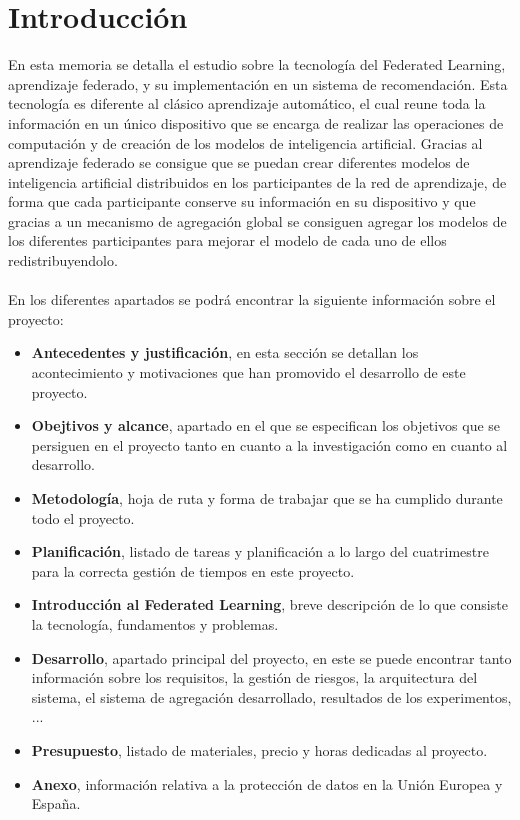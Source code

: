 \chapter{Introducción}
\thispagestyle{fancy}

En esta memoria se detalla el estudio sobre la tecnología del Federated Learning, aprendizaje federado, y su implementación en un sistema de recomendación. Esta tecnología es diferente al clásico aprendizaje automático, el cual reune toda la información en un único dispositivo que se encarga de realizar las operaciones de computación y de creación de los modelos de inteligencia artificial. Gracias al aprendizaje federado se consigue que se puedan crear diferentes modelos de inteligencia artificial distribuidos en los participantes de la red de aprendizaje, de forma que cada participante conserve su información en su dispositivo y que gracias a un mecanismo de agregación global se consiguen agregar los modelos de los diferentes participantes para mejorar el modelo de cada uno de ellos redistribuyendolo. 
\\ \\
En los diferentes apartados se podrá encontrar la siguiente información sobre el proyecto:
\begin{itemize}
    \item \textbf{Antecedentes y justificación}, en esta sección se detallan los acontecimiento y motivaciones que han promovido el desarrollo de este proyecto.
    \item \textbf{Obejtivos y alcance}, apartado en el que se especifican los objetivos que se persiguen en el proyecto tanto en cuanto a la investigación como en cuanto al desarrollo.
    \item \textbf{Metodología}, hoja de ruta y forma de trabajar que se ha cumplido durante todo el proyecto.
    \item \textbf{Planificación}, listado de tareas y planificación a lo largo del cuatrimestre para la correcta gestión de tiempos en este proyecto.
    \item \textbf{Introducción al Federated Learning}, breve descripción de lo que consiste la tecnología, fundamentos y problemas.
    \item \textbf{Desarrollo}, apartado principal del proyecto, en este se puede encontrar tanto información sobre los requisitos, la gestión de riesgos, la arquitectura del sistema, el sistema de agregación desarrollado, resultados de los experimentos, ...
    \item \textbf{Presupuesto}, listado de materiales, precio y horas dedicadas al proyecto.
    \item \textbf{Anexo}, información relativa a la protección de datos en la Unión Europea y España.
\end{itemize}

